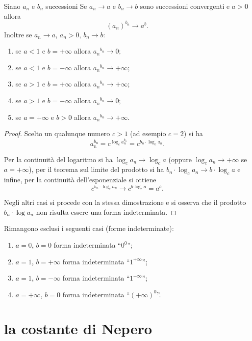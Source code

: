 \begin{theorem}
Siano $a_n$ e $b_n$ successioni
Se $a_n\to a$ e $b_n \to b$
sono successioni convergenti e $a>0$
allora
\[
  (a_n)^{b_n} \to a^b.
\]
Inoltre se $a_n \to a$, $a_n>0$, $b_n \to b$:
\begin{enumerate}
\item se $a<1$ e $b=+\infty$ allora ${a_n}^{b_n} \to 0$;
\item se $a<1$ e $b=-\infty$ allora ${a_n}^{b_n} \to +\infty$;
\item se $a>1$ e $b=+\infty$ allora ${a_n}^{b_n} \to +\infty$;
\item se $a>1$ e $b=-\infty$ allora ${a_n}^{b_n} \to 0$;
\item se $a=+\infty$ e $b>0$ allora ${a_n}^{b_n} \to +\infty$.
\end{enumerate}

\end{theorem}
%
\begin{proof}
Scelto un qualunque numero $c>1$ (ad esempio $c=2$)
si ha
\[
  a_n^{b_n} = c^{\log_c a_n^{b_n}}
   = c^{b_n \cdot \log_c a_n}.
\]

Per la continuità del logaritmo si ha $\log_c a_n \to \log_c a$
(oppure $\log_c a_n \to +\infty$ se $a=+\infty$),
per il teorema sul limite del prodotto si ha $b_n\cdot \log_c a_n \to b\cdot \log_c a$
e infine, per la continuità dell'esponenziale si ottiene
\[
  c^{b_n \cdot \log_c a_n} \to c^{b\log_c a} = a^b.
\]

Negli altri casi si procede con la stessa dimostrazione
e si osserva che il prodotto $b_n \cdot \log a_n$ non risulta essere
una forma indeterminata.
\end{proof}

Rimangono esclusi i seguenti casi (forme indeterminate):
\begin{enumerate}
\item $a=0$, $b=0$ forma indeterminata ``$0^0$'';
\item $a=1$, $b=+\infty$ forma indeterminata ``$1^{+\infty}$'';
\item $a=1$, $b=-\infty$ forma indeterminata ``$1^{-\infty}$'';
\item $a=+\infty$, $b=0$ forma indeterminata ``$(+\infty)^0$''.
\end{enumerate}

\section{la costante di Nepero}

